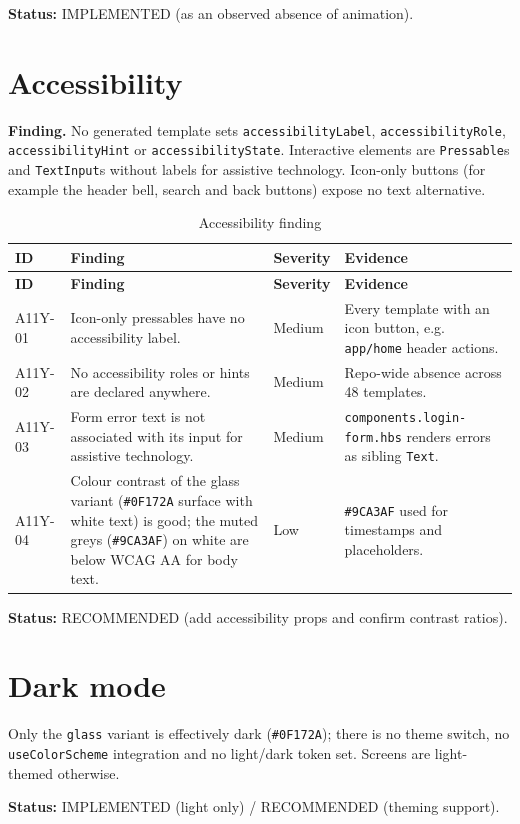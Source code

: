 \textbf{Status:} IMPLEMENTED (as an observed absence of animation).

\section{Accessibility}

\textbf{Finding.} No generated template sets
\texttt{accessibilityLabel}, \texttt{accessibilityRole},
\texttt{accessibilityHint} or \texttt{accessibilityState}. Interactive elements are
\texttt{Pressable}s and \texttt{TextInput}s without labels for assistive
technology. Icon-only buttons (for example the header bell, search and back
buttons) expose no text alternative.

\begin{longtable}{@{}L{1.4cm}L{4.4cm}L{3cm}L{5.4cm}@{}}
\caption{Accessibility finding}\\
\toprule
\textbf{ID} & \textbf{Finding} & \textbf{Severity} & \textbf{Evidence} \\
\midrule
\endfirsthead
\toprule
\textbf{ID} & \textbf{Finding} & \textbf{Severity} & \textbf{Evidence} \\
\midrule
\endhead
A11Y-01 & Icon-only pressables have no accessibility label. & Medium & Every template with an icon button, e.g. \texttt{app/home} header actions. \\
A11Y-02 & No accessibility roles or hints are declared anywhere. & Medium & Repo-wide absence across 48 templates. \\
A11Y-03 & Form error text is not associated with its input for assistive technology. & Medium & \texttt{components.login-form.hbs} renders errors as sibling \texttt{Text}. \\
A11Y-04 & Colour contrast of the glass variant (\texttt{\#0F172A} surface with white text) is good; the muted greys (\texttt{\#9CA3AF}) on white are below WCAG AA for body text. & Low & \texttt{\#9CA3AF} used for timestamps and placeholders. \\
\bottomrule
\end{longtable}

\textbf{Status:} RECOMMENDED (add accessibility props and confirm contrast ratios).

\section{Dark mode}

Only the \texttt{glass} variant is effectively dark
(\texttt{\#0F172A}); there is no theme switch, no \texttt{useColorScheme}
integration and no light/dark token set. Screens are light-themed otherwise.

\textbf{Status:} IMPLEMENTED (light only) / RECOMMENDED (theming support).
